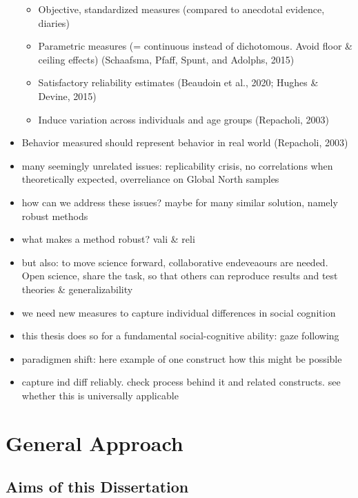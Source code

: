 \documentclass[
]{scrbook}
\providecommand{\tightlist}{%
  \setlength{\itemsep}{0pt}\setlength{\parskip}{0pt}}
\begin{document}
\begin{itemize}
  \begin{itemize}
  \tightlist
  \item
    Objective, standardized measures (compared to anecdotal evidence, diaries)
  \item
    Parametric measures (= continuous instead of dichotomous. Avoid floor \& ceiling effects) (Schaafsma, Pfaff, Spunt, and Adolphs, 2015)
  \item
    Satisfactory reliability estimates (Beaudoin et al., 2020; Hughes \& Devine, 2015)
  \item
    Induce variation across individuals and age groups (Repacholi, 2003)
  \end{itemize}
\item
  Behavior measured should represent behavior in real world (Repacholi, 2003)
\item
  many seemingly unrelated issues: replicability crisis, no correlations when theoretically expected, overreliance on Global North samples
\item
  how can we address these issues? maybe for many similar solution, namely robust methods
\item
  what makes a method robust? vali \& reli
\item
  but also: to move science forward, collaborative endeveaours are needed. Open science, share the task, so that others can reproduce results and test theories \& generalizability
\item
  we need new measures to capture individual differences in social cognition
\item
  this thesis does so for a fundamental social-cognitive ability: gaze following
\item
  paradigmen shift: here example of one construct how this might be possible
\item
  capture ind diff reliably. check process behind it and related constructs. see whether this is universally applicable
\end{itemize}

\chapter{General Approach}\label{approach}

\section{Aims of this Dissertation}\label{aimsgeneral}
\end{document}
